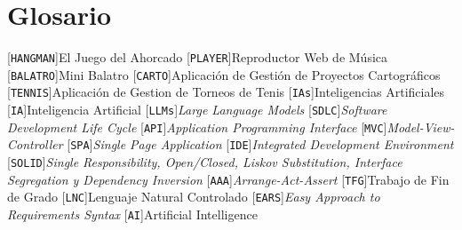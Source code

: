 
\chapter*{Glosario} 

\begin{acronym}
  [\texttt{HANGMAN}]{El Juego del Ahorcado}
  [\texttt{PLAYER}]{Reproductor Web de Música}
  [\texttt{BALATRO}]{Mini Balatro}
  [\texttt{CARTO}]{Aplicación de Gestión de Proyectos Cartográficos}
  [\texttt{TENNIS}]{Aplicación de Gestion de Torneos de Tenis}
  [\texttt{IAs}]{Inteligencias Artificiales}
  [\texttt{IA}]{Inteligencia Artificial}
  [\texttt{LLMs}]{\textit{Large Language Models}}
  [\texttt{SDLC}]{\textit{Software Development Life Cycle}}
  [\texttt{API}]{\textit{Application Programming Interface}}
  [\texttt{MVC}]{\textit{Model-View-Controller}}
  [\texttt{SPA}]{\textit{Single Page Application}}
  [\texttt{IDE}]{\textit{Integrated Development Environment}}
  [\texttt{SOLID}]{\textit{Single Responsibility, Open/Closed, Liskov Substitution, Interface Segregation y Dependency Inversion}}
  [\texttt{AAA}]{\textit{Arrange-Act-Assert}}
  [\texttt{TFG}]{Trabajo de Fin de Grado}
  [\texttt{LNC}]{Lenguaje Natural Controlado}
  [\texttt{EARS}]{\textit{Easy Approach to Requirements Syntax}}
  [\texttt{AI}]{Artificial Intelligence}
\end{acronym}